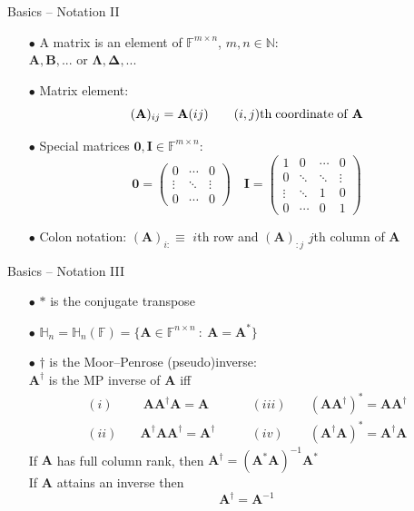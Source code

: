 \documentclass{beamer}
\newcommand{\bgk}[1]{\boldsymbol{#1}}
\newcommand{\bzero}{\bgk{0}}
\newcommand{\bDelta}{\bgk{\Delta}}
\newcommand{\bLambda}{\bgk{\Lambda}}
\newcommand{\bvec}[1]{\mathbf{#1}}
\newcommand{\vA}{\bvec{A}}
\newcommand{\vB}{\bvec{B}}
\newcommand{\vI}{\bvec{I}}
\begin{document}
\begin{frame}{Basics -- Notation II}

\begin{itemize}
    \item[$\bullet$] A matrix is an element of $\mathbb{F}^{m\times n}$, $m, n\in\mathbb{N}$:\\
    $\vA, \vB, ...$ or $\bLambda, \bDelta, ...$
    \item[$\bullet$] Matrix element:
    $$
    (\vA)_{ij} = \vA({ij}) \qquad (i,j)\rm{th\;coordinate\;of\; \vA}  
    $$
    \item[$\bullet$] Special matrices $\bzero, \vI \in \mathbb{F}^{m\times n}$:
    $$
    \bzero = 
    \begin{pmatrix}
    0       & \cdots    & 0 \\
    \vdots  & \ddots    & \vdots\\
    0       & \cdots    & 0
    \end{pmatrix}
    \quad
    \vI = 
    \begin{pmatrix}
    1       & 0         & \cdots    & 0 \\
    0       & \ddots    & \ddots    & \vdots\\
    \vdots  & \ddots    &  1        & 0\\
    0       & \cdots    & 0         & 1
    \end{pmatrix}
    $$
    \item[$\bullet$] Colon notation: 
    $(\vA)_{i:}\equiv$ $i$th row and $(\vA)_{:j}$ $j$th column of $\vA$
\end{itemize}
\end{frame}

\begin{frame}{Basics -- Notation III}
\begin{itemize}
    \item[$\bullet$] $*$ is the conjugate transpose
    \item[$\bullet$] $\mathbb{H}_n = \mathbb{H}_n(\mathbb{F}) = \{ \vA\in\mathbb{F}^{n\times n}~:~ \vA = \vA^* \}$
    \item[$\bullet$] $\dagger$ is the Moor--Penrose (pseudo)inverse:\\ 
    \pause
    $\vA^\dagger$ is the MP inverse of $\vA$ iff
    \begin{equation*}
    \begin{aligned}
    (i)&\quad  ~\vA\vA^\dagger\vA = \vA \qquad &(iii)&\quad  (\vA\vA^\dagger)^* = \vA\vA^\dagger\\
    (ii)&\quad \vA^\dagger\vA\vA^\dagger = \vA^\dagger \qquad &(iv)&\quad (\vA^\dagger\vA)^* = \vA^\dagger\vA
    \end{aligned}
    \end{equation*}
    \pause
    If $\vA$ has full column rank, then  $\vA^\dagger = (\vA^* \vA)^{-1} \vA^*$\\
    If $\vA$ attains an inverse then
    $$
    \vA^\dagger = \vA^{-1}
    $$
\end{itemize}

\end{frame}
\end{document}
